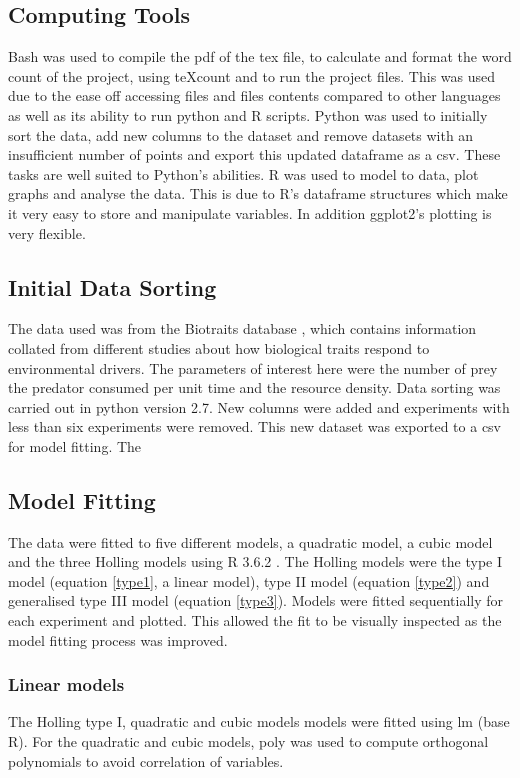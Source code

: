 \documentclass{article}
\begin{document}
\subsection{Computing Tools}
Bash was used to compile the pdf of the tex file, to calculate and format the word count of the project, using teXcount and to run the project files. This was used due to the ease off accessing files and files contents compared to other languages as well as its ability to run python and R scripts.
Python was used to initially sort the data, add new columns to the dataset and remove datasets with an insufficient number of points and export this updated dataframe as a csv. These tasks are well suited to Python's abilities.
R was used to model to data, plot graphs and analyse the data. This is due to R's dataframe structures which make it very easy to store and manipulate variables. In addition ggplot2's plotting is very flexible.
\subsection{Initial Data Sorting}
The data used was from the Biotraits database \cite{Dell2013}, which contains information collated from different studies about how biological traits respond to environmental drivers. The parameters of interest here were the number of prey the predator consumed per unit time and the resource density. Data sorting was carried out in python version 2.7. New columns were added and experiments with less than six experiments were removed. This new dataset was exported to a csv for model fitting. The
\subsection{Model Fitting}
The data were fitted to five different models, a quadratic model, a cubic model and the three Holling models \cite{Holling1959} using R 3.6.2 \cite{RCoreTeam2017}. The Holling models were the type I model (equation \ref{type1}, a linear model), type II model (equation \ref{type2}) and generalised type III model (equation \ref{type3}).
Models were fitted sequentially for each experiment and plotted. This allowed the fit to be visually inspected as the model fitting process was improved.
\subsubsection{Linear models}
 The Holling type I, quadratic and cubic models models were fitted using lm (base R). For the quadratic and cubic models, poly was used to compute orthogonal polynomials to avoid correlation of variables.
\end{document}
